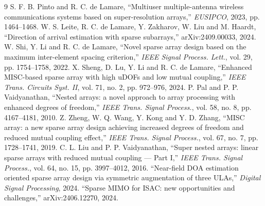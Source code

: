 \documentclass[11pt]{article}
\begin{document}
\begin{thebibliography}{9}
 S. F. B. Pinto and R. C. de Lamare, ``Multiuser multiple-antenna wireless
communications systems based on super-resolution arrays,'' \emph{EUSIPCO}, 2023, pp. 1464--1468.
 W. S. Leite, R. C. de Lamare, Y. Zakharov, W. Liu and M. Haardt, ``Direction of
arrival estimation with sparse subarrays,'' arXiv:2409.00033, 2024.
 W. Shi, Y. Li and R. C. de Lamare, ``Novel sparse array design based on the maximum
inter-element spacing criterion,'' \emph{IEEE Signal Process. Lett.}, vol. 29, pp. 1754--1758, 2022.
 X. Sheng, D. Lu, Y. Li and R. C. de Lamare, ``Enhanced MISC-based sparse array
with high uDOFs and low mutual coupling,'' \emph{IEEE Trans. Circuits Syst. II}, vol. 71, no. 2,
pp. 972--976, 2024.
 P. Pal and P. P. Vaidyanathan, ``Nested arrays: a novel approach to array
processing with enhanced degrees of freedom,'' \emph{IEEE Trans. Signal Process.}, vol. 58, no. 8,
pp. 4167--4181, 2010.
 Z. Zheng, W. Q. Wang, Y. Kong and Y. D. Zhang, ``MISC array: a new sparse array
design achieving increased degrees of freedom and reduced mutual coupling effect,'' \emph{IEEE Trans.
Signal Process.}, vol. 67, no. 7, pp. 1728--1741, 2019.
 C. L. Liu and P. P. Vaidyanathan, ``Super nested arrays: linear sparse arrays with
reduced mutual coupling --- Part I,'' \emph{IEEE Trans. Signal Process.}, vol. 64, no. 15,
pp. 3997--4012, 2016.
 ``Near-field DOA estimation oriented sparse array design via symmetric
augmentation of three ULAs,'' \emph{Digital Signal Processing}, 2024.
 ``Sparse MIMO for ISAC: new opportunities and challenges,'' arXiv:2406.12270,
2024.
\end{thebibliography}
\end{document}
